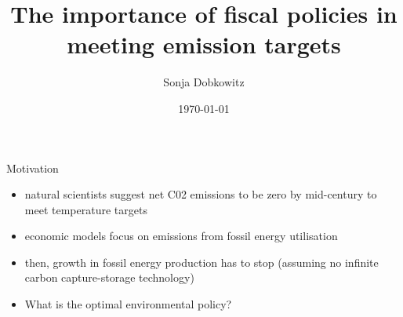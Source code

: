 \documentclass[11pt,aspectratio=169]{beamer}
\author[Sonja Dobkowitz]{\small Sonja Dobkowitz}
\institute[University of Bonn]{University of Bonn}
\title{The importance of fiscal policies in meeting emission targets}
\institute{University of Bonn}
\date{\today}
\newcommand{\ar}{$\Rightarrow$ \ }
\begin{document}
	
	{
		\begin{frame}
		\titlepage
	\end{frame}
}



\begin{frame}{Motivation}

\begin{itemize}[<+-| alert@+>]
\item natural scientists suggest net C02 emissions to be zero by mid-century \citep{Rogelj2018MitigationDevelopment.} to meet temperature targets
\vspace{3mm}
\item economic models focus on emissions from fossil energy utilisation
\vspace{3mm}
\item then, growth in fossil energy production has to stop (assuming no infinite carbon capture-storage technology)  %
\vspace{3mm}
\item What is the optimal environmental policy?
\end{itemize}
\end{frame}
\end{document}
